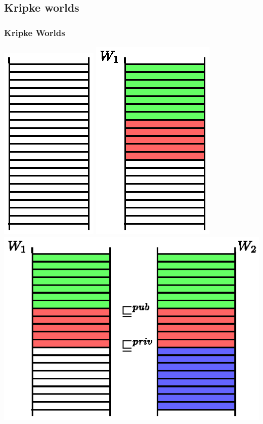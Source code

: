 \documentclass{beamer}
\begin{document}
\subsection{Kripke worlds}
\begin{frame}
  \frametitle{Kripke Worlds}
  \begin{overprint}
    \includegraphics{Worlds/w1.eps}
    \includegraphics{Worlds/w2.eps}
    \includegraphics{Worlds/w3.eps}

\end{overprint}
\end{frame}
\end{document}
